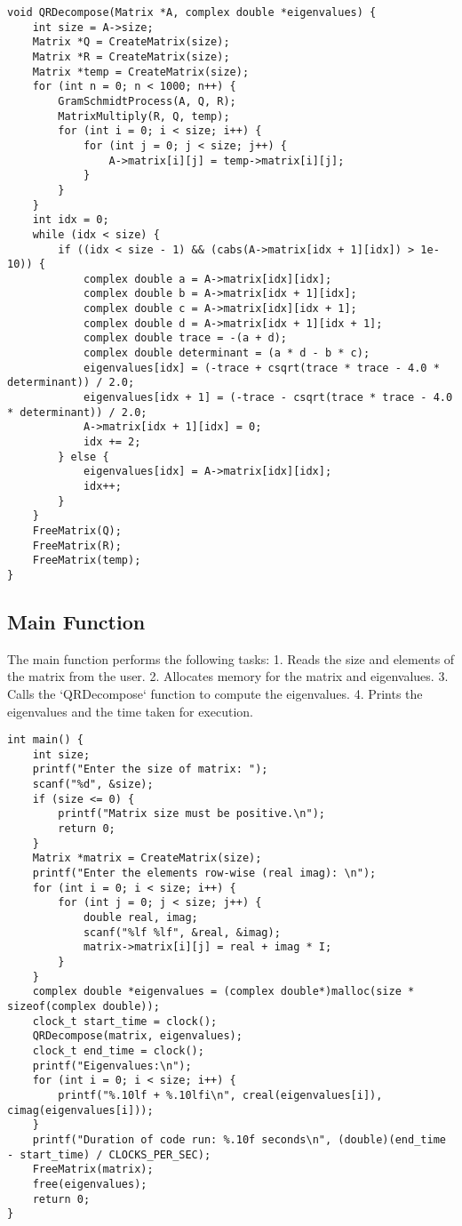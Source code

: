 \documentclass[article]{IEEEtran}
\numberwithin{equation}{enumi}
\numberwithin{figure}{enumi}
\begin{document}
\begin{lstlisting}[caption={QR Decomposition Function}]
void QRDecompose(Matrix *A, complex double *eigenvalues) {
    int size = A->size;
    Matrix *Q = CreateMatrix(size);
    Matrix *R = CreateMatrix(size);
    Matrix *temp = CreateMatrix(size);
    for (int n = 0; n < 1000; n++) {
        GramSchmidtProcess(A, Q, R);
        MatrixMultiply(R, Q, temp);
        for (int i = 0; i < size; i++) {
            for (int j = 0; j < size; j++) {
                A->matrix[i][j] = temp->matrix[i][j];
            }
        }
    }
    int idx = 0;
    while (idx < size) {
        if ((idx < size - 1) && (cabs(A->matrix[idx + 1][idx]) > 1e-10)) {
            complex double a = A->matrix[idx][idx];
            complex double b = A->matrix[idx + 1][idx];
            complex double c = A->matrix[idx][idx + 1];
            complex double d = A->matrix[idx + 1][idx + 1];
            complex double trace = -(a + d);
            complex double determinant = (a * d - b * c);
            eigenvalues[idx] = (-trace + csqrt(trace * trace - 4.0 * determinant)) / 2.0;
            eigenvalues[idx + 1] = (-trace - csqrt(trace * trace - 4.0 * determinant)) / 2.0;
            A->matrix[idx + 1][idx] = 0;
            idx += 2;
        } else {
            eigenvalues[idx] = A->matrix[idx][idx];
            idx++;
        }
    }
    FreeMatrix(Q);
    FreeMatrix(R);
    FreeMatrix(temp);
}
\end{lstlisting}

\subsection*{Main Function}
The main function performs the following tasks:
1. Reads the size and elements of the matrix from the user.
2. Allocates memory for the matrix and eigenvalues.
3. Calls the `QRDecompose` function to compute the eigenvalues.
4. Prints the eigenvalues and the time taken for execution.

\begin{lstlisting}[caption={Main Function}]
int main() {
    int size;
    printf("Enter the size of matrix: ");
    scanf("%d", &size);
    if (size <= 0) {
        printf("Matrix size must be positive.\n");
        return 0;
    }
    Matrix *matrix = CreateMatrix(size);
    printf("Enter the elements row-wise (real imag): \n");
    for (int i = 0; i < size; i++) {
        for (int j = 0; j < size; j++) {
            double real, imag;
            scanf("%lf %lf", &real, &imag);
            matrix->matrix[i][j] = real + imag * I;
        }
    }
    complex double *eigenvalues = (complex double*)malloc(size * sizeof(complex double));
    clock_t start_time = clock();
    QRDecompose(matrix, eigenvalues);
    clock_t end_time = clock();
    printf("Eigenvalues:\n");
    for (int i = 0; i < size; i++) {
        printf("%.10lf + %.10lfi\n", creal(eigenvalues[i]), cimag(eigenvalues[i]));
    }
    printf("Duration of code run: %.10f seconds\n", (double)(end_time - start_time) / CLOCKS_PER_SEC);
    FreeMatrix(matrix);
    free(eigenvalues);
    return 0;
}
\end{lstlisting}
\end{document}
